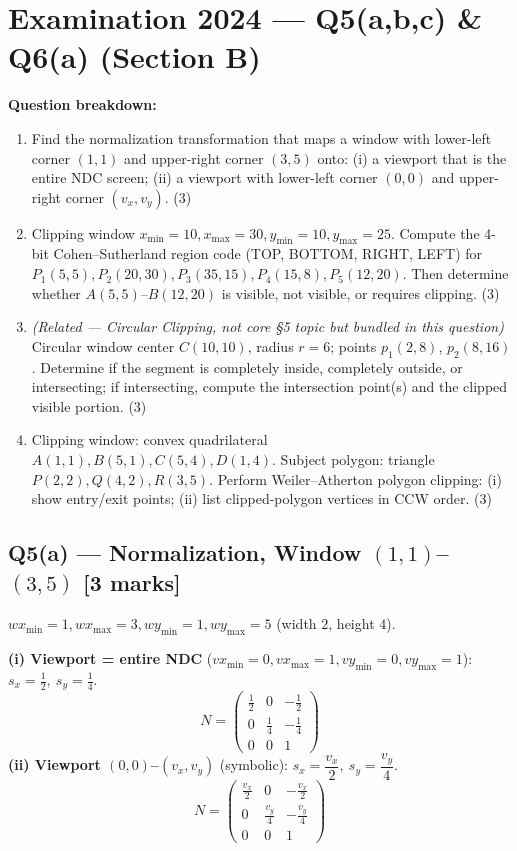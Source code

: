 \documentclass[12pt, a4paper]{article}
\newenvironment{solutionbox}{\begin{mdframed}[style=solutionframe]}{\end{mdframed}}
\begin{document}
\section{Examination 2024 --- Q5(a,b,c) \& Q6(a) (Section B)}
\begin{solutionbox}
\textbf{Question breakdown:}
\begin{enumerate}[noitemsep]
  \item[Q5(a)] Find the normalization transformation that maps a window with lower-left corner $(1,1)$ and upper-right corner $(3,5)$ onto: (i) a viewport that is the entire NDC screen; (ii) a viewport with lower-left corner $(0,0)$ and upper-right corner $(v_x,v_y)$. (3)
  \item[Q5(b)] Clipping window $x_{\min}=10,x_{\max}=30,y_{\min}=10,y_{\max}=25$. Compute the 4-bit Cohen--Sutherland region code (TOP, BOTTOM, RIGHT, LEFT) for $P_1(5,5),P_2(20,30),P_3(35,15),P_4(15,8),P_5(12,20)$. Then determine whether $A(5,5)$--$B(12,20)$ is visible, not visible, or requires clipping. (3)
  \item[Q5(c)] \emph{(Related --- Circular Clipping, not core §5 topic but bundled in this question)} Circular window center $C(10,10)$, radius $r=6$; points $p_1(2,8)$, $p_2(8,16)$. Determine if the segment is completely inside, completely outside, or intersecting; if intersecting, compute the intersection point(s) and the clipped visible portion. (3)
  \item[Q6(a)] Clipping window: convex quadrilateral $A(1,1),B(5,1),C(5,4),D(1,4)$. Subject polygon: triangle $P(2,2),Q(4,2),R(3,5)$. Perform Weiler--Atherton polygon clipping: (i) show entry/exit points; (ii) list clipped-polygon vertices in CCW order. (3)
\end{enumerate}
\end{solutionbox}

\subsection*{Q5(a) --- Normalization, Window $(1,1)$--$(3,5)$ [3 marks]}
$wx_{\min}=1,wx_{\max}=3,wy_{\min}=1,wy_{\max}=5$ (width $2$, height $4$).
\begin{solutionbox}
\textbf{(i) Viewport = entire NDC} ($vx_{\min}=0,vx_{\max}=1,vy_{\min}=0,vy_{\max}=1$): $s_x=\frac{1}{2},\ s_y=\frac{1}{4}$.
$$N = \begin{pmatrix}\tfrac12&0&-\tfrac12\\0&\tfrac14&-\tfrac14\\0&0&1\end{pmatrix}$$
\textbf{(ii) Viewport $(0,0)$--$(v_x,v_y)$} (symbolic): $s_x=\dfrac{v_x}{2},\ s_y=\dfrac{v_y}{4}$.
$$N = \begin{pmatrix}\tfrac{v_x}{2}&0&-\tfrac{v_x}{2}\\0&\tfrac{v_y}{4}&-\tfrac{v_y}{4}\\0&0&1\end{pmatrix}$$
\end{solutionbox}
\end{document}

